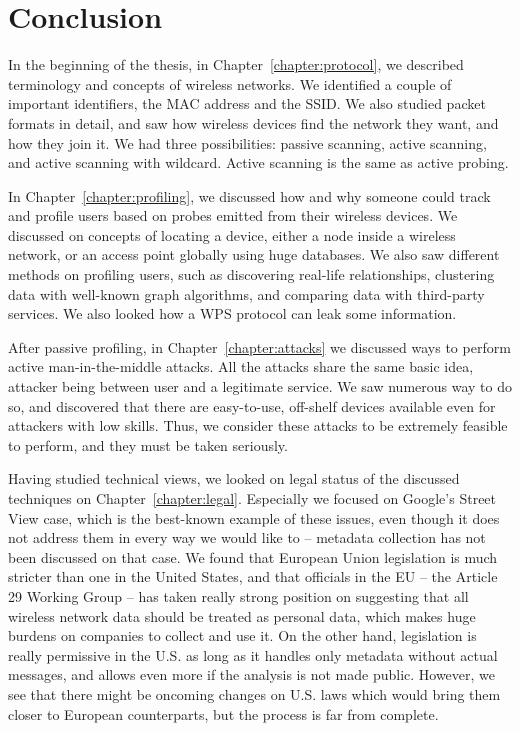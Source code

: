 \documentclass[12pt,a4paper,oneside,pdftex]{report}
\begin{document}
\chapter{Conclusion}
\label{chapter:conclusion}

In the beginning of the thesis, in Chapter~\ref{chapter:protocol}, we described terminology and concepts of wireless networks. We identified a couple of important identifiers, the MAC address and the SSID. We also studied packet formats in detail, and saw how wireless devices find the network they want, and how they join it. We had three possibilities: passive scanning, active scanning, and active scanning with wildcard. Active scanning is the same as active probing.

In Chapter~\ref{chapter:profiling}, we discussed how and why someone could track and profile users based on probes emitted from their wireless devices. We discussed on concepts of locating a device, either a node inside a wireless network, or an access point globally using huge databases. We also saw different methods on profiling users, such as discovering real-life relationships, clustering data with well-known graph algorithms, and comparing data with third-party services. We also looked how a WPS protocol can leak some information.

After passive profiling, in Chapter~\ref{chapter:attacks} we discussed ways to perform active man-in-the-middle attacks. All the attacks share the same basic idea, attacker being between user and a legitimate service. We saw numerous way to do so, and discovered that there are easy-to-use, off-shelf devices available even for attackers with low skills. Thus, we consider these attacks to be extremely feasible to perform, and they must be taken seriously.

Having studied technical views, we looked on legal status of the discussed techniques on Chapter~\ref{chapter:legal}. Especially we focused on Google's Street View case, which is the best-known example of these issues, even though it does not address them in every way we would like to -- metadata collection has not been discussed on that case. We found that European Union legislation is much stricter than one in the United States, and that officials in the EU -- the Article 29 Working Group -- has taken really strong position on suggesting that all wireless network data should be treated as personal data, which makes huge burdens on companies to collect and use it. On the other hand, legislation is really permissive in the U.S. as long as it handles only metadata without actual messages, and allows even more if the analysis is not made public. However, we see that there might be oncoming changes on U.S. laws which would bring them closer to European counterparts, but the process is far from complete.
\end{document}
